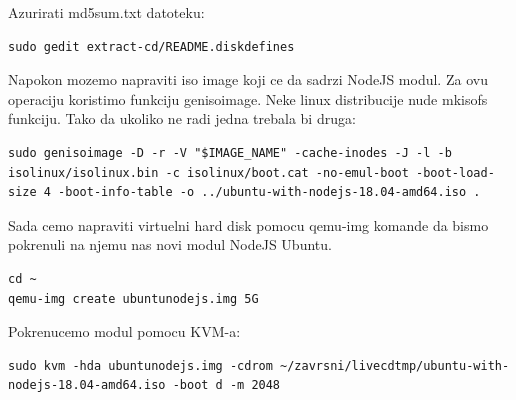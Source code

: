 \documentclass[12pt,vi]{mitthesis}
\begin{document}
\noindent
Azurirati md5sum.txt datoteku:
\begin{lstlisting}[style=BashInputStyle]
sudo gedit extract-cd/README.diskdefines
\end{lstlisting}

\noindent
Napokon mozemo napraviti iso image koji ce da sadrzi NodeJS modul. Za ovu operaciju koristimo funkciju genisoimage. Neke linux distribucije nude mkisofs funkciju. Tako da ukoliko ne radi jedna trebala bi druga:
\begin{lstlisting}[style=BashInputStyle]
sudo genisoimage -D -r -V "$IMAGE_NAME" -cache-inodes -J -l -b isolinux/isolinux.bin -c isolinux/boot.cat -no-emul-boot -boot-load-size 4 -boot-info-table -o ../ubuntu-with-nodejs-18.04-amd64.iso .
\end{lstlisting}

\noindent
Sada cemo napraviti virtuelni hard disk pomocu qemu-img komande da bismo pokrenuli na njemu nas novi modul NodeJS Ubuntu.
\begin{lstlisting}[style=BashInputStyle]
cd ~
qemu-img create ubuntunodejs.img 5G
\end{lstlisting}

\noindent 
Pokrenucemo modul pomocu KVM-a:
\begin{lstlisting}[style=BashInputStyle]
sudo kvm -hda ubuntunodejs.img -cdrom ~/zavrsni/livecdtmp/ubuntu-with-nodejs-18.04-amd64.iso -boot d -m 2048
\end{lstlisting}
\end{document}
